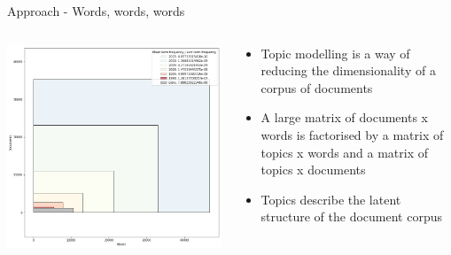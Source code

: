 \documentclass[9pt]{beamer}
\begin{document}
\begin{frame}{Approach - Words, words, words}

\begin{columns}
	\begin{column}{0.5\linewidth}
		\begin{center}
			\includegraphics[width=\linewidth]{volume_variety_bible.png}
		\end{center}
	\end{column}
	\begin{column}{0.5\linewidth}
		\begin{center}
			\begin{itemize}
				\item Topic modelling is a way of reducing the dimensionality of a corpus of documents
				\item A large matrix of documents x words is factorised by
				a matrix of topics x words and a matrix of topics x documents
			\citep{Lee1999}
				\item Topics describe the latent structure of the document corpus
				
			\end{itemize}
		\end{center}
	\end{column}
\end{columns}

\end{frame}
\end{document}
